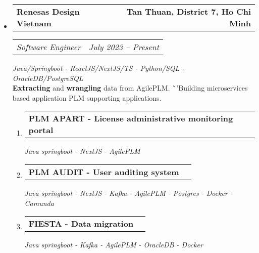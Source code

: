 \documentclass[11pt,letterpaper]{article}
\makeatletter
\newcommand{\headerrow}[2]
{\begin{tabular*}{\linewidth}{l@{\extracolsep{\fill}}r}
#1 &
#2 \\
\end{tabular*}}
\makeatother
\begin{document}
\renewcommand\labelitemi{}
\renewcommand\labelitemii{$\bullet$}
\begin{itemize}[leftmargin=1em]
    \parskip=0.1em


    \item
          \headerrow
          {\large\textbf{Renesas Design Vietnam}}
          {\textbf{Tan Thuan, District 7, Ho Chi Minh}}
          \headerrow
          {\emph{Software Engineer}}
          {\emph{July 2023 -- Present}}
          {\emph{Java/Springboot - ReactJS/NextJS/TS - Python/SQL - OracleDB/PostgreSQL}}\\

          \textbf{Extracting} and \textbf{wrangling} data from AgilePLM.
          \textbf`'{Building microservices based application} PLM supporting applications.
          \begin{enumerate}
              \item
                    \headerrow
                    {\textbf{PLM APART - License administrative monitoring portal}}
                    {\emph{}}
                    {\emph{Java springboot - NextJS - AgilePLM}}

              \item
                    \headerrow
                    {\textbf{PLM AUDIT - User auditing system}}
                    {\emph{}}
                    {\emph{Java springboot - NextJS - Kafka - AgilePLM - Postgres - Docker - Camunda}}

              \item
                    \headerrow
                    {\textbf{FIESTA - Data migration}}
                    {\emph{}}
                    {\emph{Java springboot - Kafka - AgilePLM - OracleDB - Docker}}


\end{enumerate}
\end{itemize}
\end{document}
